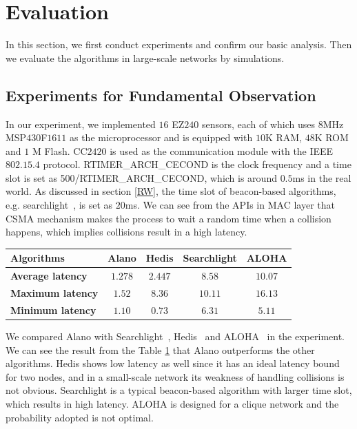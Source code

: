 \section{Evaluation}
\label{Evaluation}

In this section, we first conduct experiments and confirm our basic analysis.
Then we evaluate the algorithms in large-scale networks by simulations.



\subsection{Experiments for Fundamental Observation}


In our experiment, we implemented $16$ EZ$240$ sensors, each of which uses $8$MHz MSP$430$F$1611$ 
as the microprocessor and is equipped with $10$K RAM, 
$48$K ROM and $1$ M Flash. CC$2420$ is used as the communication 
module with the IEEE $802.15.4$ protocol. RTIMER\_ARCH\_CECOND is the clock frequency 
and a time slot is set as 500/RTIMER\_ARCH\_CECOND,
which is around $0.5$ms in the real world. As discussed in section \ref{RW}, the time slot of beacon-based 
algorithms, e.g. searchlight~\cite{bakht2012searchlight}, is set as $20$ms.
We can see from the APIs in MAC layer that CSMA mechanism makes the process to wait a random time 
when a collision happens, which implies collisions result in a high latency.    

\begin{table}[htbp]
\label{Exp}
\centering
\begin{tabular}{|l|c|c|c|c|} 
\hline
\textbf{Algorithms} & \textbf{Alano} & \textbf{Hedis} & \textbf{Searchlight} & \textbf{ALOHA} \\
\hline
\textbf{Average latency} & \textbf{$1.278$} & \textbf{$2.447$} & \textbf{$8.58$} & \textbf{$10.07$} \\
\hline
\textbf{Maximum latency} & \textbf{$1.52$} & \textbf{$8.36$} & \textbf{$10.11$} & \textbf{$16.13$} \\
\hline
\textbf{Minimum latency} & \textbf{$1.10$} & \textbf{$0.73$} & \textbf{$6.31$} & \textbf{$5.11$} \\
\hline

\end{tabular}
\end{table}

We compared Alano with Searchlight~\cite{bakht2012searchlight}, Hedis~\cite{chen2015heterogeneous}
and ALOHA~\cite{you2011aloha} in the experiment. We can see the result from the Table \ref{Exp} that Alano outperforms the other algorithms.
Hedis shows low latency as well since it has an ideal latency bound for two nodes, 
and in a small-scale network its weakness of handling collisions is not obvious. 
Searchlight is a typical beacon-based algorithm with larger time slot, which results in high latency.
ALOHA is designed for a clique network and the probability adopted is not optimal.


